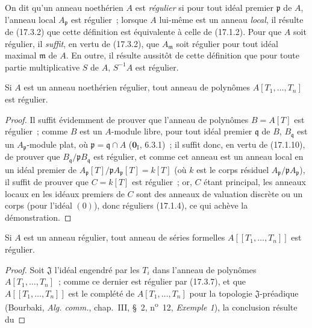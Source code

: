\begin{env}[17.3.6]
\label{0.17.3.6-fr}
On dit qu'un anneau noethérien $A$ est \emph{régulier} si pour tout idéal
premier $\mathfrak{p}$ de $A$, l'anneau local $A_{\mathfrak{p}}$ est
régulier~; lorsque $A$ lui-même est un anneau \emph{local}, il résulte de (17.3.2)
que cette définition est équivalente à celle de (17.1.2). Pour que $A$ soit
régulier, il \emph{suffit}, en vertu de (17.3.2), que $A_{\mathfrak{m}}$ soit
régulier pour tout idéal maximal $\mathfrak{m}$ de $A$. En outre, il résulte
aussitôt de cette définition que pour toute partie multiplicative $S$ de
$A$, $S^{-1}A$ est régulier.
\end{env}

\begin{proposition}[17.3.7]
\label{0.17.3.7-fr}
Si $A$ est un anneau noethérien régulier, tout anneau de polynômes
$A[T_1,\ldots,T_n]$ est régulier.
\end{proposition}

\begin{proof}
Il suffit évidemment de prouver que l'anneau de polynômes $B=A[T]$ est
régulier~; comme $B$ est un $A$-module libre, pour tout idéal premier
$\mathfrak{q}$ de $B$, $B_{\mathfrak{q}}$ est un
$A_{\mathfrak{p}}$-module plat, où $\mathfrak{p}=\mathfrak{q}\cap A$
($\mathbf{0}_{\mathrm I}$, 6.3.1)~; il suffit donc, en vertu de (17.1.10), de prouver
que $B_{\mathfrak{q}}/\mathfrak{p}B_{\mathfrak{q}}$ est régulier, et comme
cet anneau est un anneau local en un idéal premier de
$A_{\mathfrak{p}}[T]/\mathfrak{p}A_{\mathfrak{p}}[T]=k[T]$ (où $k$ est le
corps résiduel $A_{\mathfrak{p}}/\mathfrak{p}A_{\mathfrak{p}}$), il suffit
de prouver que $C=k[T]$ est régulier~; or, $C$ étant principal, les anneaux
locaux en les idéaux premiers de $C$ sont des anneaux de valuation discrète
ou un corps (pour l'idéal $(0)$), donc réguliers (17.1.4), ce qui achève la
démonstration.
\end{proof}

\begin{corollary}[17.3.8]
\label{0.17.3.8-fr}
Si $A$ est un anneau régulier, tout anneau de séries formelles
$A[[T_1,\ldots,T_n]]$ est régulier.
\end{corollary}

\begin{proof}
Soit $\mathfrak{J}$ l'idéal engendré par les $T_i$ dans l'anneau de polynômes
$A[T_1,\ldots,T_n]$~; comme ce dernier est régulier par (17.3.7), et que
$A[[T_1,\ldots,T_n]]$ est le complété de $A[T_1,\ldots,T_n]$ pour la
topologie $\mathfrak{J}$-préadique (Bourbaki, \emph{Alg. comm.}, chap.~III,
\S~2, n\textsuperscript{o}~12, \emph{Exemple 1}), la conclusion résulte du
\end{proof}

